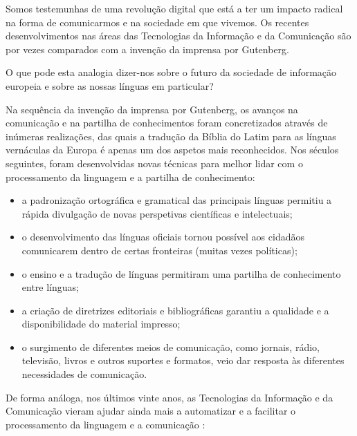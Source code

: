 \begin{multicols}{2}

Somos testemunhas de uma revolução digital que está a ter um impacto radical na forma de comunicarmos e na sociedade em que vivemos. 
Os recentes desenvolvimentos nas áreas das Tecnologias da Informação e da Comunicação são por vezes comparados com a invenção da imprensa por Gutenberg. 

O que pode esta analogia dizer-nos sobre o futuro da sociedade de informação europeia e sobre as nossas línguas em particular?



Na sequência da invenção da imprensa por Gutenberg, os avanços na comunicação e na partilha de conhecimentos foram concretizados através de 
inúmeras realizações, das quais a tradução da Bíblia do Latim para as línguas vernáculas da Europa é apenas um dos aspetos
mais reconhecidos. Nos séculos seguintes, foram desenvolvidas novas técnicas para melhor lidar com o processamento da linguagem 
e a partilha de co\-nhe\-ci\-men\-to:

\medskip
\begin{itemize}
   \item a padronização ortográfica e gramatical das principais línguas permitiu a rápida divulgação de novas perspetivas científicas e intelectuais;
      \item o desenvolvimento das línguas oficiais tornou possível aos cidadãos comunicarem dentro de certas fronteiras (muitas vezes políticas);
      \item o ensino e a tradução de línguas permitiram uma partilha de conhecimento entre línguas;
      \item a criação de diretrizes editoriais e bibliográficas garantiu a qualidade e a disponibilidade do material impresso;
      \item o surgimento de diferentes meios de comunicação, como jornais, rádio, televisão, livros e outros suportes e formatos, veio dar resposta às diferentes necessidades de comunicação. 
\end{itemize}


 De forma análoga, nos últimos vinte anos, as Tecnologias da Informação e da Comunicação vieram ajudar ainda mais 
a automatizar e a facilitar o processamento da linguagem e a comunicação :


\end{multicols}
